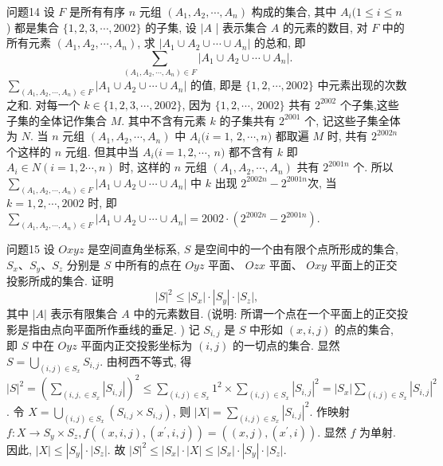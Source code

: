 问题14 设 $F$ 是所有有序 $n$ 元组 $\left(A_1, A_2, \cdots, A_n\right)$ 构成的集合, 其中 $A_i(1 \leqslant i \leqslant n$ ) 都是集合 $\{1,2,3, \cdots, 2002\}$ 的子集, 设 $\mid A$ | 表示集合 $A$ 的元素的数目, 对 $F$ 中的所有元素 $\left(A_1, A_2, \cdots, A_n\right)$, 求 $\left|A_1 \cup A_2 \cup \cdots \cup A_n\right|$ 的总和, 即
$$
\sum_{\left(A_1, A_2, \cdots, A_n\right) \in F}\left|A_1 \cup A_2 \cup \cdots \cup A_n\right| .
$$
$\sum_{\left(A_1, A_2, \cdots, A_n\right) \in F}\left|A_1 \cup A_2 \cup \cdots \cup A_n\right|$ 的值, 即是 $\{1,2, \cdots, 2002\}$ 中元素出现的次数之和.
对每一个 $k \in\{1,2,3, \cdots, 2002\}$, 因为 $\{1,2, \cdots$, $2002\}$ 共有 $2^{2002}$ 个子集,这些子集的全体记作集合 $M$. 其中不含有元素 $k$ 的子集共有 $2^{2001}$ 个, 记这些子集全体为 $N$. 当 $n$ 元组 $\left(A_1, A_2, \cdots, A_n\right)$ 中 $A_i(i=1$, $2, \cdots, n)$ 都取遍 $M$ 时, 共有 $2^{2002 n}$ 个这样的 $n$ 元组.
但其中当 $A_i(i=1,2, \cdots$, $n)$ 都不含有 $k$ 即 $A_i \in N(i=1,2 \cdots, n)$ 时, 这样的 $n$ 元组 $\left(A_1, A_2, \cdots, A_n\right)$ 共有 $2^{2001 n}$ 个.
所以 $\sum_{\left(A_1, A_2, \cdots, A_n\right) \in F}\left|A_1 \cup A_2 \cup \cdots \cup A_n\right|$ 中 $k$ 出现 $2^{2002 n}-2^{2001 n}$次, 当 $k=1,2, \cdots, 2002$ 时, 即 $\sum_{\left(A_1, A_2, \cdots, A_n\right) \in F}\left|A_1 \cup A_2 \cup \cdots \cup A_n\right|=2002 \cdot(2^{2002 n}-2^{2001 n} )$.



问题15 设 $O x y z$ 是空间直角坐标系, $S$ 是空间中的一个由有限个点所形成的集合, $S_x 、 S_y 、 S_z$ 分别是 $S$ 中所有的点在 $O y z$ 平面、 $O z x$ 平面、 $O x y$ 平面上的正交投影所成的集合.
证明
$$
|S|^2 \leqslant\left|S_x\right| \cdot\left|S_y\right| \cdot\left|S_z\right|,
$$
其中 $|A|$ 表示有限集合 $A$ 中的元素数目.
(说明: 所谓一个点在一个平面上的正交投影是指由点向平面所作垂线的垂足.
)
记 $S_{i, j}$ 是 $S$ 中形如 $(x, i, j)$ 的点的集合, 即 $S$ 中在 $O y z$ 平面内正交投影坐标为 $(i, j)$ 的一切点的集合.
显然 $S=\bigcup_{(i, j) \in S_x} S_{i, j}$. 由柯西不等式, 得 $|S|^2=\left(\sum_{\left(i, j, \in S_x\right.}\left|S_{i, j}\right|\right)^2 \leqslant \sum_{(i, j) \in S_x} 1^2 \times \sum_{(i, j) \in S_x}\left|S_{i, j}\right|^2=\left|S_x\right| \sum_{(i, j) \in S_x}\left|S_{i, j}\right|^2$. 令 $X= \bigcup_{(i, j) \in S_x}\left(S_{i, j} \times S_{i, j}\right)$, 则 $|X|=\sum_{(i, j) \in S_x}\left|S_{i, j}\right|^2$.
作映射 $f: X \rightarrow S_y \times S_z, f\left((x, i, j),\left(x^{\prime}, i, j\right)\right)=\left((x, j),\left(x^{\prime}, i\right)\right)$. 显然 $f$ 为单射.
因此, $|X| \leqslant\left|S_y\right| \cdot\left|S_z\right|$. 故 $|S|^2 \leqslant\left|S_x\right| \cdot|X| \leqslant\left|S_x\right| \cdot \left|S_y\right| \cdot\left|S_z\right|$.



